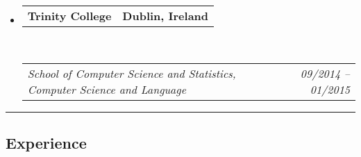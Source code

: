 \documentclass[10pt,letterpaper]{article}
\makeatletter
\newcommand{\headerrow}[2]
{\begin{tabular*}{\linewidth}{l@{\extracolsep{\fill}}r}
	#1 &
	#2 \\
\end{tabular*}}
\makeatother
\begin{document}
\begin{itemize}
		\item 
	\headerrow
		{\textbf{Trinity College}}
		{\textbf{Dublin, Ireland}}
	\\
	\headerrow
		{\emph{School of Computer Science and Statistics, Computer Science and Language}}
		{\emph{09/2014 -- 01/2015}}

\end{itemize}

\hrule
\vspace{-0.4em}
\subsection*{Experience}
\end{document}
